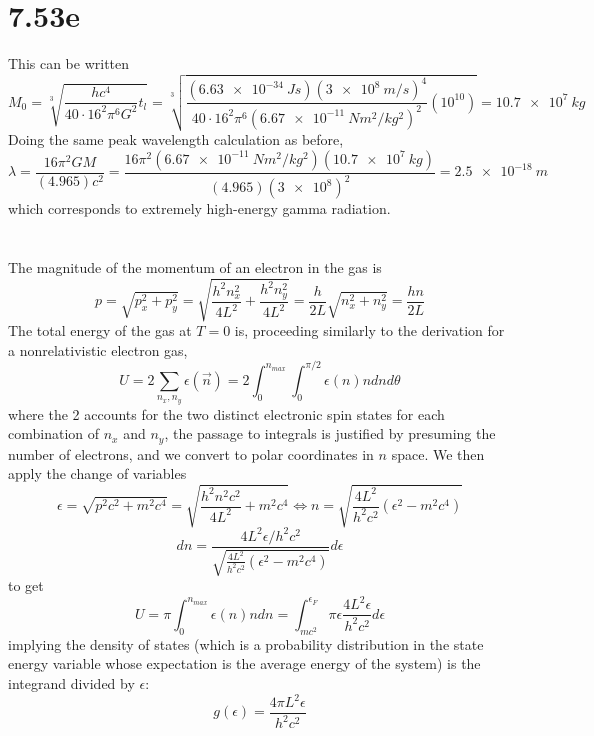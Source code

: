 \documentclass{article}
\begin{document}
\section*{7.53e}
This can be written
\[
  M_{0}=\sqrt[3]{\frac{hc^{4}}{40\cdot 16^{2}\pi^{6}G^{2}}t_{l}}
  =\sqrt[3]{\frac{(\SI{6.63e-34}{Js})(\SI{3e8}{m/s})^{4}}{40\cdot 16^{2}\pi^{6}(\SI{6.67e-11}{Nm^{2}/kg^{2}})^{2}}(10^{10})}
  =\SI{10.7e7}{kg}
\]
Doing the same peak wavelength calculation as before,
\[
  \lambda = \frac{16\pi^{2}GM}{(4.965)c^{2}}=\frac{16\pi^{2}(\SI{6.67e-11}{Nm^{2}/kg^{2}})(\SI{10.7e7}{kg})}{(4.965)(\SI{3e8})^{2}}
  =\SI{2.5e-18}{m}
\]
which corresponds to extremely high-energy gamma radiation.

\section{}
The magnitude of the momentum of an electron in the gas is
\[
  p=\sqrt{p_{x}^{2}+p_{y}^{2}}=\sqrt{\frac{h^{2}n_{x}^{2}}{4L^{2}}+\frac{h^{2}n_{y}^{2}}{4L^{2}}}=\frac{h}{2L}\sqrt{n_{x}^{2}+n_{y}^{2}}
  =\frac{hn}{2L}
\]
The total energy of the gas at $T=0$ is, proceeding similarly to the derivation for a nonrelativistic electron gas,
\[
  U=2\sum_{n_{x},n_{y}}\epsilon(\vec{n})=2\int_{0}^{n_{max}}\int_{0}^{\pi/2}\epsilon(n)n dnd\theta
\]
where the 2 accounts for the two distinct electronic spin states for each combination of $n_{x}$ and $n_{y}$,
the passage to integrals is justified by presuming the number of electrons, and we convert to polar coordinates in $n$ space.
We then apply the change of variables
\[
  \epsilon=\sqrt{p^{2}c^{2}+m^{2}c^{4}}=\sqrt{\frac{h^{2}n^{2}c^{2}}{4L^{2}}+m^{2}c^{4}}
  \Leftrightarrow n=\sqrt{\frac{4L^{2}}{h^{2}c^{2}}(\epsilon^{2}-m^{2}c^{4})}
\]
\[
  dn=\frac{4L^{2}\epsilon/h^{2}c^{2}}{\sqrt{\frac{4L^{2}}{h^{2}c^{2}}(\epsilon^{2}-m^{2}c^{4})}}d\epsilon
\]
to get
\[
  U={\pi}\int_{0}^{n_{max}}\epsilon(n)ndn=\int_{mc^{2}}^{\epsilon_{F}}\pi\epsilon\frac{4L^{2}\epsilon}{h^{2}c^{2}}d\epsilon
\]
implying the density of states (which is a probability distribution in the state energy variable whose expectation is the average energy of
the system) is the integrand
divided by $\epsilon$:
\[
  g(\epsilon) = \frac{4\pi L^{2}\epsilon}{h^{2}c^{2}}
\]
\end{document}
